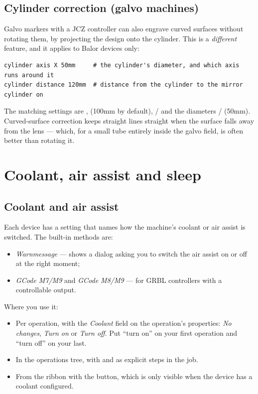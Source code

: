 \subsection*{Cylinder correction (galvo machines)}

Galvo markers with a JCZ controller can also engrave curved surfaces without
rotating them, by projecting the design onto the cylinder. This is a
\emph{different} feature, and it applies to Balor devices only:

\begin{lstlisting}[style=konsole]
cylinder axis X 50mm     # the cylinder's diameter, and which axis runs around it
cylinder distance 120mm  # distance from the cylinder to the mirror
cylinder on
\end{lstlisting}

\noindent The matching settings are ,
 (100\unit{mm} by default),
 /  and the diameters
 /  (50\unit{mm}).
Curved-surface correction keeps straight lines straight when the surface falls
away from the lens --- which, for a small tube entirely inside the galvo field,
is often better than rotating it.

\section{Coolant, air assist and sleep}

\subsection*{Coolant and air assist}

Each device has a  setting that names how the machine's coolant or
air assist is switched. The built-in methods are:

\begin{itemize}
  \item \emph{Warnmessage} --- shows a dialog asking you to switch the air assist
        on or off at the right moment;
  \item \emph{GCode M7/M9} and \emph{GCode M8/M9} --- for GRBL controllers with a
        controllable output.
\end{itemize}

\noindent Where you use it:

\begin{itemize}
  \item Per operation, with the \emph{Coolant} field on the operation's
        properties: \emph{No changes}, \emph{Turn on} or \emph{Turn off}. Put
        ``turn on'' on your first operation and ``turn off'' on your last.
  \item In the operations tree, with  and
         as explicit steps in the job.
  \item From the ribbon with the  button, which is only visible when
        the device has a coolant configured.
\end{itemize}

